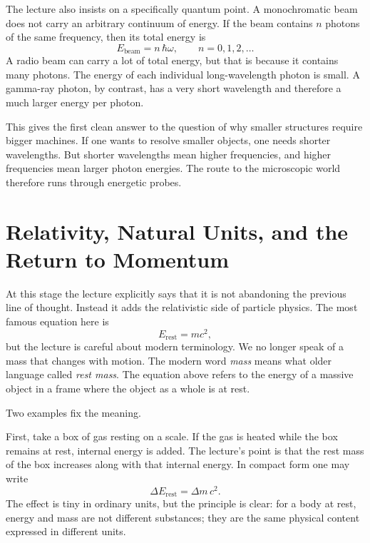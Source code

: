 The lecture also insists on a specifically quantum point. A monochromatic beam does not carry an arbitrary continuum of energy. If the beam contains \(n\) photons of the same frequency, then its total energy is
\begin{equation}
E_{\text{beam}} = n\,\hbar\omega,
\qquad
n=0,1,2,\dots
\end{equation}
A radio beam can carry a lot of total energy, but that is because it contains many photons. The energy of each individual long-wavelength photon is small. A gamma-ray photon, by contrast, has a very short wavelength and therefore a much larger energy per photon.

This gives the first clean answer to the question of why smaller structures require bigger machines. If one wants to resolve smaller objects, one needs shorter wavelengths. But shorter wavelengths mean higher frequencies, and higher frequencies mean larger photon energies. The route to the microscopic world therefore runs through energetic probes.

\section{Relativity, Natural Units, and the Return to Momentum}

At this stage the lecture explicitly says that it is not abandoning the previous line of thought. Instead it adds the relativistic side of particle physics. The most famous equation here is
\begin{equation}
E_{\mathrm{rest}} = mc^2,
\end{equation}
but the lecture is careful about modern terminology. We no longer speak of a mass that changes with motion. The modern word \emph{mass} means what older language called \emph{rest mass}. The equation above refers to the energy of a massive object in a frame where the object as a whole is at rest.

Two examples fix the meaning.

First, take a box of gas resting on a scale. If the gas is heated while the box remains at rest, internal energy is added. The lecture's point is that the rest mass of the box increases along with that internal energy. In compact form one may write
\begin{equation}
\Delta E_{\mathrm{rest}} = \Delta m\,c^2.
\end{equation}
The effect is tiny in ordinary units, but the principle is clear: for a body at rest, energy and mass are not different substances; they are the same physical content expressed in different units.

